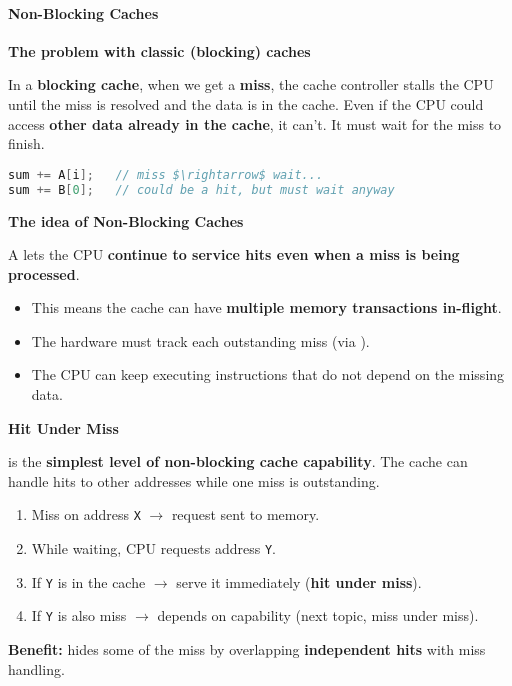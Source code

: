 \paragraph{Non-Blocking Caches}

\begin{flushleft}
    \textcolor{Red2}{ \textbf{The problem with classic (blocking) caches}}
\end{flushleft}
In a \textbf{blocking cache}, when we get a \textbf{miss}, the cache controller stalls the CPU until the miss is resolved and the data is in the cache. Even if the CPU could access \textbf{other data already in the cache}, it can't. It must wait for the miss to finish.
\begin{lstlisting}[language=c, mathescape=true]
sum += A[i];   // miss $\rightarrow$ wait...
sum += B[0];   // could be a hit, but must wait anyway\end{lstlisting}

\highspace
\begin{flushleft}
    \textcolor{Green3}{ \textbf{The idea of Non-Blocking Caches}}
\end{flushleft}
A  lets the CPU \textbf{continue to service hits even when a miss is being processed}.
\begin{itemize}
    \item This means the cache can have \textbf{multiple memory transactions in-flight}.
    \item The hardware must track each outstanding miss (via ).
    \item The CPU can keep executing instructions that do not depend on the missing data.
\end{itemize}

\highspace
\begin{flushleft}
    \textcolor{Green3}{ \textbf{Hit Under Miss}}
\end{flushleft}
 is the \textbf{simplest level of non-blocking cache capability}. The cache can handle hits to other addresses while one miss is outstanding.
\begin{enumerate}
    \item Miss on address \texttt{X} $\rightarrow$ request sent to memory.
    \item While waiting, CPU requests address \texttt{Y}.
    \item If \texttt{Y} is in the cache $\rightarrow$ serve it immediately (\textbf{hit under miss}).
    \item If \texttt{Y} is also miss $\rightarrow$ depends on capability (next topic, miss under miss).
\end{enumerate}
\textcolor{Green3}{ \textbf{Benefit:}} hides some of the miss by overlapping \textbf{independent hits} with miss handling.

